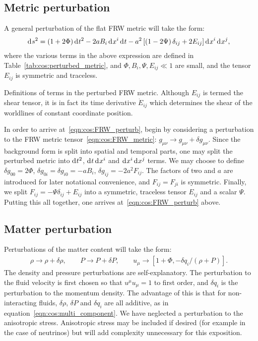 \subsection{Metric perturbation}
A general perturbation of the flat FRW metric will take the form:
\begin{equation}
  \operatorname{d}^{}\!{s}^2 = (1+2\Phi)\operatorname{d}^{}\!{t}^2 -2a B_i \operatorname{d}^{}\!{x}^i \operatorname{d}^{}\!{t}  -a^2 \left[ \left( 1 - 2 \Psi \right)\delta_{ij} + 2E_{ij} \right] \operatorname{d}^{}\!{x}^i \operatorname{d}^{}\!{x}^j,
  \label{eqn:cos:FRW_perturb}
\end{equation}
where the various terms in the above expression are defined in Table~\ref{tab:cos:perturbed_metric}, and \({\Phi,B_i,\Psi,E_{ij}\ll1}\) are small, and the tensor \(E_{ij}\) is symmetric and traceless.
\begin{table}[tp]
  \centering
  
  \caption{Definitions of terms in the perturbed FRW metric. Although \(E_{ij}\) is termed the shear tensor, it is in fact its time derivative \(\dot{E}_{ij}\) which determines the shear of the worldlines of constant coordinate position.}\label{tab:cos:perturbed_metric}
\end{table}

In order to arrive at~\eqref{eqn:cos:FRW_perturb}, begin by considering a perturbation to the FRW metric tensor~\eqref{eqn:cos:FRW_metric}: \({g_{\mu\nu} \rightarrow g_{\mu\nu} + \delta g_{\mu\nu}}\). Since the background form is split into spatial and temporal parts, one may split the perturbed metric into \(\operatorname{d}^{}\!{t}^2\), \(\operatorname{d}^{}\!{t}\operatorname{d}^{}\!{x^i}\) and \(\operatorname{d}^{}\!{x^i}\operatorname{d}^{}\!{x^j}\) terms. We may choose to define \({\delta g_{00} = 2\Phi}\), \({\delta g_{0i} = \delta g_{i0} = -a B_i}\), \({\delta g_{ij} = -2a^2F_{ij}}\). The factors of two and \(a\) are introduced for later notational convenience, and \({F_{ij} = F_{ji}}\) is symmetric. Finally, we split \({F_{ij} = -\Psi\delta_{ij} + E_{ij}}\) into a symmetric, traceless tensor \(E_{ij}\) and a scalar \(\Psi\). Putting this all together, one arrives at~\eqref{eqn:cos:FRW_perturb} above.

\subsection{Matter perturbation}
Perturbations of the matter content will take the form:
\begin{align}
  \rho \rightarrow \rho + \delta \rho, \qquad 
  P \rightarrow P + \delta P, \qquad
  u_\mu \rightarrow \left[ 1+\Phi, -\delta q_i/(\rho+P)\right].
  \label{eqn:cos:matter_perturb}
\end{align}
The density and pressure perturbations are self-explanatory. The perturbation to the fluid velocity is first chosen so that \(u^\mu u_\mu=1\) to first order, and \(\delta q_i\) is the perturbation to the momentum density. The advantage of this is that for non-interacting fluids, \(\delta\rho\), \(\delta P\) and \(\delta q_i\) are all additive, as in equation~\eqref{eqn:cos:multi_component}. We have neglected a perturbation to the anisotropic stress. Anisotropic stress may be included if desired (for example in the case of neutrinos) but will add complexity unnecessary for this exposition. 

